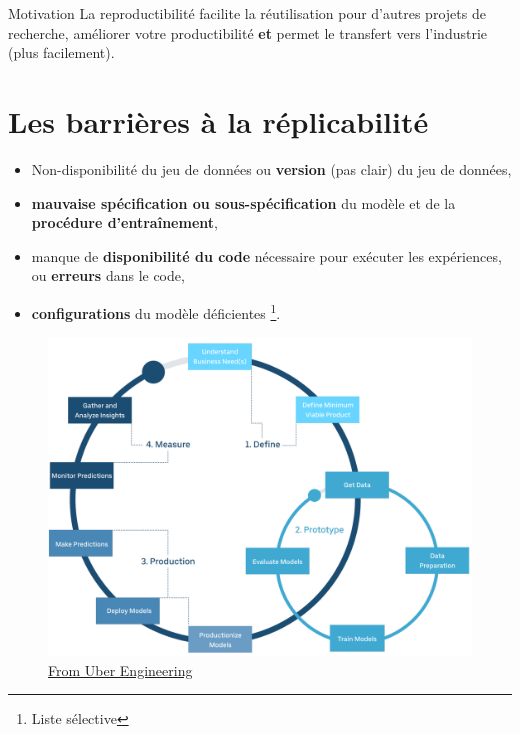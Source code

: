 \documentclass[aspectratio=169,10pt,xcolor=x11names,english,french]{beamer}
\begin{document}
	\begin{frame}{Motivation}
		La reproductibilité facilite la réutilisation pour d'autres projets de recherche, améliorer votre productibilité \textbf{et} permet le transfert vers l'industrie (plus facilement). 
	\end{frame}
	
	\section{Les barrières à la réplicabilité}
	\begin{frame}
		\begin{itemize}
			\item<1-> Non-disponibilité du jeu de données ou \textbf{version} (pas clair) du jeu de données, 
			\item<2-> \textbf{mauvaise spécification ou sous-spécification} du modèle et de la \textbf{procédure d'entraînement},
			\item<3-> manque de \textbf{disponibilité du code} nécessaire pour exécuter les expériences, ou \textbf{erreurs} dans le code,
			\item<4-> \textbf{configurations} du modèle déficientes \cite{pineau2020improving}\footnote{Liste sélective}.
		\end{itemize}
	\end{frame}
	
	\begin{frame}
		\begin{figure}
			\centering
			\includegraphics[scale=0.19]{img/cycle.png}
			\caption{\href{https://eng.uber.com/scaling-michelangelo/}{From Uber Engineering}}
		\end{figure}
	\end{frame}
	
\end{document}
